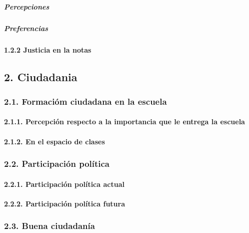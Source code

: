 \documentclass[
  letterpaper,
  DIV=11,
  numbers=noendperiod]{scrartcl}
\let\oldparagraph\paragraph
\renewcommand{\paragraph}[1]{\oldparagraph{#1}\mbox{}}
\let\oldsubparagraph\subparagraph
\renewcommand{\subparagraph}[1]{\oldsubparagraph{#1}\mbox{}}
\begin{document}
\subparagraph{Percepciones}\label{percepciones-1}

\subparagraph{Preferencias}\label{preferencias-1}

\paragraph{1.2.2 Justicia en la notas}\label{justicia-en-la-notas}

\subsection{2. Ciudadania}\label{ciudadania}

\subsubsection{2.1. Formacióm ciudadana en la
escuela}\label{formaciuxf3m-ciudadana-en-la-escuela}

\paragraph{2.1.1. Percepción respecto a la importancia que le entrega la
escuela}\label{percepciuxf3n-respecto-a-la-importancia-que-le-entrega-la-escuela}

\paragraph{2.1.2. En el espacio de
clases}\label{en-el-espacio-de-clases}

\subsubsection{2.2. Participación
política}\label{participaciuxf3n-poluxedtica}

\paragraph{2.2.1. Participación política
actual}\label{participaciuxf3n-poluxedtica-actual}

\paragraph{2.2.2. Participación política
futura}\label{participaciuxf3n-poluxedtica-futura}

\subsubsection{2.3. Buena ciudadanía}\label{buena-ciudadanuxeda}

\subsubsection{}\label{section}
\end{document}
